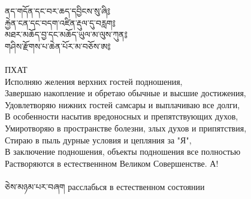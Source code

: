 ནད་གདོན་དང་བར་ཆད་དབྱིངས་སུ་ཞི༔\\
རྐྱེན་ངན་དང་བདག་འཛིན་རྡུལ་དུ་བརླག༔\\
མཐར་མཆོད་བྱ་དང་མཆོད་ཡུལ་མ་ལུས་ཀུན༔\\
གཤིས་རྫོགས་པ་ཆེན་པོར་མ་བཅོས་ཨ༔\\
\\
\ru
ПХАТ\\
Исполняю желения верхних гостей подношения,\\
Завершаю накопление и обретаю обычные и высшие достижения,\\
Удовлетворяю нижних гостей самсары и выплачиваю все долги,\\
В особенности насытив вредоносных и препятствующих духов,\\
Умиротворяю в пространстве болезни, злых духов и припятствия,\\
Стираю в пыль дурные условия и цепляния за "Я",\\
В заключение подношения, объекты подношения все полностью\\
Растворяются в естественнном Великом Совершенстве. А!\\
\\
\ti
ཅེས་མཉམ་པར་བཞག \ru расслабься в естественном состоянии
